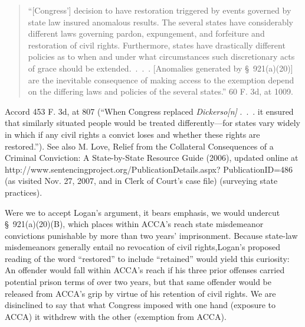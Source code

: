 \begin{quote}

	\newpage  ``[Congress'] decision to have restoration triggered by events governed by state law insured anomalous results. The several states have considerably different laws governing pardon, expungement, and forfeiture and restoration of civil rights. Furthermore, states have drastically different policies as to when and under what circumstances such discretionary acts of grace should be extended.~.~.~. [Anomalies generated by \S~921(a)(20)] are the inevitable consequence of making access to the exemption depend on the differing laws and policies of the several states.'' 60 F. 3d, at 1009.

\end{quote}

\noindent Accord 453 F. 3d, at 807 (``When Congress replaced \emph{Dickerso[n]} .~.~. it ensured that similarly situated people would be treated differently---for states vary widely in which if any civil rights a convict loses and whether these rights are restored.''). See also M. Love, Relief from the Collateral Consequences of a Criminal Conviction: A State-by-State Resource Guide (2006), updated online at http://www.sentencingproject.org/PublicationDetails.aspx? PublicationID=486 (as visited Nov. 27, 2007, and in Clerk of Court's case file) (surveying state practices).

  Were we to accept Logan's argument, it bears emphasis, we would undercut \S~921(a)(20)(B), which places within ACCA's reach state misdemeanor convictions punishable by more than two years' imprisonment. Because state-law misdemeanors generally entail no revocation of civil rights,\footnotemark[5] Logan's proposed reading of the word ``restored'' to include ``retained'' would yield this curiosity: An offender would fall within ACCA's reach if his three prior offenses carried potential prison terms of over two years, but that same of\newpage fender would be released from ACCA's grip by virtue of his retention of civil rights. We are disinclined to say that what Congress imposed with one hand (exposure to ACCA) it withdrew with the other (exemption from ACCA).


